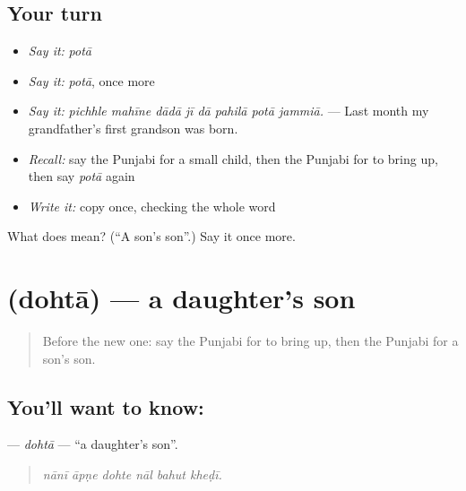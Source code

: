 \subsection*{Your turn}
\begin{itemize}
\raggedright
  \item \emph{Say it:} \emph{potā}
  \item \emph{Say it:} \emph{potā}, once more
  \item \emph{Say it:} \emph{pichhle mahīne dādā jī dā pahilā potā jammiā.} — Last month my grandfather's first grandson was born.
  \item \emph{Recall:} say the Punjabi for a small child, then the Punjabi for to bring up, then say \emph{potā} again
  \item \emph{Write it:} copy \textbf{} once, checking the whole word
\end{itemize}

\begin{tcolorbox}[breakable,colback=teal!4,colframe=teal!35!black,title={Before you move on}]
What does  mean? (\textquotedblleft{}A son's son\textquotedblright{}.) Say it once more.
\end{tcolorbox}
\section[\texorpdfstring{\pa{ਦੋਹਤਾ} (dohtā)}{ਦੋਹਤਾ (dohtā)}]{ (dohtā) — a daughter's son}

\label{lesson:PA-C314-dohta}



\begin{quote}
Before the new one: say the Punjabi for to bring up, then the Punjabi for a son's son.
\end{quote}

\subsection*{You'll want to know: }
\textbf{} — \emph{dohtā} — \textquotedblleft{}a daughter's son\textquotedblright{}.

\begin{quote}
     
\end{quote}

\begin{quote}
\emph{nānī āpṇe dohte nāl bahut kheḍī.}
\end{quote}

